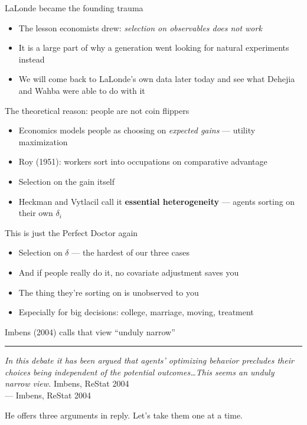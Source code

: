 \documentclass{beamer}
\newcommand{\pullquote}[2]{%
  \begin{flushleft}
    {\color{accent}\rule{0.4em}{2.5em}}\hspace{0.6em}%
    \begin{minipage}[c]{0.85\textwidth}
      {\color{charcoal}\itshape\large #1}%
      \ifx\relax#2\relax\else\\[0.3em]{\color{warmgray}\small --- #2}\fi
    \end{minipage}
  \end{flushleft}
}
\newcommand{\highlight}[1]{\textcolor{accent}{\textbf{#1}}}
\begin{document}
\begin{frame}{LaLonde became the founding trauma}

\begin{itemize}
\item The lesson economists drew: \emph{selection on observables does not work}
\item It is a large part of why a generation went looking for natural experiments instead
\item We will come back to LaLonde's own data later today and see what Dehejia and Wahba were able to do with it
\end{itemize}

\end{frame}


\begin{frame}{The theoretical reason: people are not coin flippers}

\begin{itemize}
\item Economics models people as choosing on \emph{expected gains} --- utility maximization
\item Roy (1951): workers sort into occupations on comparative advantage
\item Selection on the gain itself
\item Heckman and Vytlacil call it \highlight{essential heterogeneity} --- agents sorting on their own $\delta_i$
\end{itemize}

\end{frame}


\begin{frame}{This is just the Perfect Doctor again}

\begin{itemize}
\item Selection on $\delta$ --- the hardest of our three cases
\item And if people really do it, no covariate adjustment saves you
\item The thing they're sorting on is unobserved to you
\item Especially for big decisions: college, marriage, moving, treatment
\end{itemize}

\end{frame}


\begin{frame}{Imbens (2004) calls that view ``unduly narrow''}

\vspace{1em}

\pullquote{In this debate it has been argued that agents' optimizing behavior precludes their choices being independent of the potential outcomes\dots This seems an unduly narrow view.}{Imbens, ReStat 2004}

\vspace{1em}

He offers three arguments in reply. Let's take them one at a time.

\end{frame}
\end{document}
